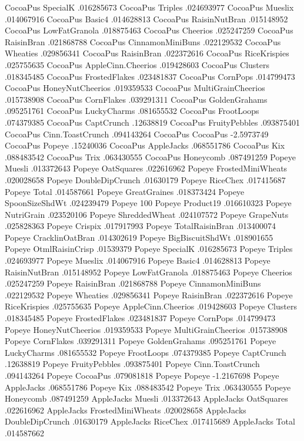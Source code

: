 CocoaPus	SpecialK	.016285673
CocoaPus	Triples	.024693977
CocoaPus	Mueslix	.014067916
CocoaPus	Basic4	.014628813
CocoaPus	RaisinNutBran	.015148952
CocoaPus	LowFatGranola	.018875463
CocoaPus	Cheerios	.025247259
CocoaPus	RaisinBran	.021868788
CocoaPus	CinnamonMiniBuns	.022129532
CocoaPus	Wheaties	.029856341
CocoaPus	RaisinBran	.022372616
CocoaPus	RiceKrispies	.025755635
CocoaPus	AppleCinn.Cheerios	.019428603
CocoaPus	Clusters	.018345485
CocoaPus	FrostedFlakes	.023481837
CocoaPus	CornPops	.014799473
CocoaPus	HoneyNutCheerios	.019359533
CocoaPus	MultiGrainCheerios	.015738908
CocoaPus	CornFlakes	.039291311
CocoaPus	GoldenGrahams	.095251761
CocoaPus	LuckyCharms	.081655532
CocoaPus	FrootLoops	.074379385
CocoaPus	CaptCrunch	.12638819
CocoaPus	FruityPebbles	.093875401
CocoaPus	Cinn.ToastCrunch	.094143264
CocoaPus	CocoaPus	-2.5973749
CocoaPus	Popeye	.15240036
CocoaPus	AppleJacks	.068551786
CocoaPus	Kix	.088483542
CocoaPus	Trix	.063430555
CocoaPus	Honeycomb	.087491259
Popeye	Muesli	.013372643
Popeye	OatSquares	.022616962
Popeye	FrostedMiniWheats	.020028658
Popeye	DoubleDipCrunch	.01630179
Popeye	RiceChex	.017415687
Popeye	Total	.014587661
Popeye	GreatGraines	.018373424
Popeye	SpoonSizeShdWt	.024239479
Popeye	100%
Popeye	Product19	.016610323
Popeye	NutriGrain	.023520106
Popeye	ShreddedWheat	.024107572
Popeye	GrapeNuts	.025828363
Popeye	Crispix	.017917993
Popeye	TotalRaisinBran	.013400074
Popeye	CracklinOatBran	.014302619
Popeye	BigBiscuitShdWt	.018901655
Popeye	OtmlRaisinCrisp	.01539379
Popeye	SpecialK	.016285673
Popeye	Triples	.024693977
Popeye	Mueslix	.014067916
Popeye	Basic4	.014628813
Popeye	RaisinNutBran	.015148952
Popeye	LowFatGranola	.018875463
Popeye	Cheerios	.025247259
Popeye	RaisinBran	.021868788
Popeye	CinnamonMiniBuns	.022129532
Popeye	Wheaties	.029856341
Popeye	RaisinBran	.022372616
Popeye	RiceKrispies	.025755635
Popeye	AppleCinn.Cheerios	.019428603
Popeye	Clusters	.018345485
Popeye	FrostedFlakes	.023481837
Popeye	CornPops	.014799473
Popeye	HoneyNutCheerios	.019359533
Popeye	MultiGrainCheerios	.015738908
Popeye	CornFlakes	.039291311
Popeye	GoldenGrahams	.095251761
Popeye	LuckyCharms	.081655532
Popeye	FrootLoops	.074379385
Popeye	CaptCrunch	.12638819
Popeye	FruityPebbles	.093875401
Popeye	Cinn.ToastCrunch	.094143264
Popeye	CocoaPus	.079081818
Popeye	Popeye	-1.2167698
Popeye	AppleJacks	.068551786
Popeye	Kix	.088483542
Popeye	Trix	.063430555
Popeye	Honeycomb	.087491259
AppleJacks	Muesli	.013372643
AppleJacks	OatSquares	.022616962
AppleJacks	FrostedMiniWheats	.020028658
AppleJacks	DoubleDipCrunch	.01630179
AppleJacks	RiceChex	.017415689
AppleJacks	Total	.014587662
